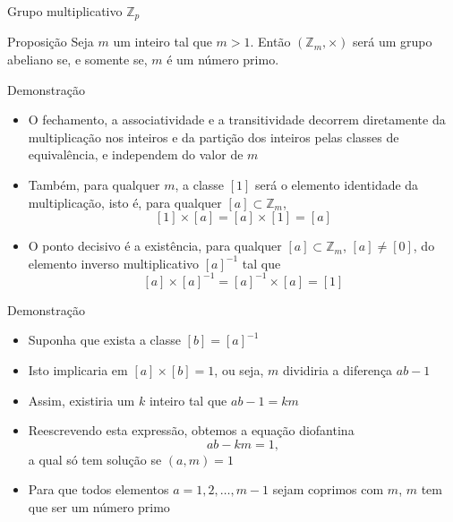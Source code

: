 \begin{frame}[fragile]{Grupo multiplicativo $\mathbb{Z}_p$}

    \begin{block}{Proposição}
        Seja $m$ um inteiro tal que $m > 1$. Então $(\mathbb{Z}_m, \times)$ será um grupo 
            abeliano se, e somente se, $m$ é um número primo.
    \end{block}

\end{frame}

\begin{frame}[fragile]{Demonstração}

    \begin{itemize}
        \item O fechamento, a associatividade e a transitividade decorrem diretamente da 
            multiplicação nos inteiros e da partição dos inteiros pelas classes de equivalência,
            e independem do valor de $m$

        \item Também, para qualquer $m$, a classe $[1]$ será o elemento identidade da 
            multiplicação, isto é, para qualquer $[a]\subset \mathbb{Z}_m$,
        $$
            [1]\times [a] = [a]\times [1] = [a]
        $$

        \item O ponto decisivo é a existência, para qualquer $[a]\subset \mathbb{Z}_m$, 
            $[a]\neq [0]$,  do elemento inverso multiplicativo $[a]^{-1}$ tal que
        $$
            [a]\times [a]^{-1} = [a]^{-1}\times [a] = [1]
        $$
    \end{itemize}

\end{frame}

\begin{frame}[fragile]{Demonstração}

    \begin{itemize}
        \item Suponha que exista a classe $[b] = [a]^{-1}$

        \item Isto implicaria em $[a]\times [b] = 1$, ou seja, $m$ dividiria a diferença $ab - 1$ 

        \item Assim, existiria um $k$ inteiro tal que $ab - 1 = km$

        \item Reescrevendo esta expressão, obtemos a equação diofantina
        $$
            ab - km = 1,
        $$
        a qual só tem solução se $(a, m) = 1$

        \item Para que todos elementos $a = 1, 2, \ldots, m - 1$ sejam coprimos com $m$, $m$ tem que
            ser um número primo 
    \end{itemize}

\end{frame}


